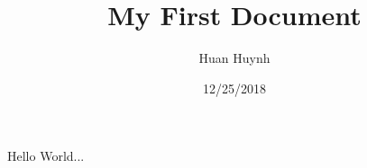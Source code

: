 \documentclass{article}
\title{My First Document}
\date{12/25/2018}
\author{Huan Huynh}
\begin{document}
	\maketitle
	\newpage
	
	Hello World...
\end{document}
